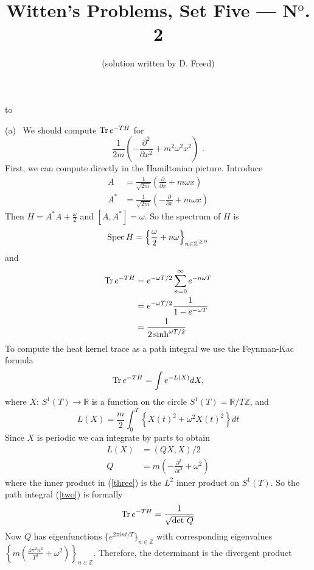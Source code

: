 \documentclass[12pt,leqno]{article}
\title{Witten's Problems, Set Five --- N$^{\text{o}}$. 2}
\author{(solution written by D. Freed)}
\date{}
\newcommand{\dbR}{{\mathbb{R}}}
\newcommand{\dbZ}{{\mathbb{Z}}}
\theoremstyle{plain}
{\theorembodyfont{}\newtheorem{thm}{Theorem}}
\theoremstyle{remark}
{\theorembodyfont{\rmfamily} \newtheorem*{Rem}{\bf Remark}}
\newcommand{\Ge}{{{\mathchoice{\,{\scriptstyle\ge}\,}
  {\,{\scriptstyle\ge}\,}
  {\,{\scriptscriptstyle\ge}\,}{\,{\scriptscriptstyle\ge}\,}}}}
\newcommand{\dspace}{\lineskip=2pt
     \baselineskip=18pt\lineskiplimit=0pt}
\newcommand{\Xdot}{\Dot{X}}
\newcommand{\Spec}{\text{\rm Spec}}
\newcommand{\Tr}{\text{\rm Tr}}
\begin{document}
\maketitle

\hbox to \hsize{\hrulefill}

\bigskip
\dspace
\noindent
(a) \ 
We should compute $\Tr\,e^{-TH}$ for
$$
\frac{1}{2m}\left(-\frac{\partial^2}{\partial x^2}+
m^2\omega^2 x^2\right)\,\,.
$$
First, we can compute directly in the Hamiltonian picture.
Introduce
\begin{align*}
A &=\frac{1}{\sqrt{2m}}\left(\frac{\partial}{\partial x}
  +m\omega x\right)\\
A^* &=\frac{1}{\sqrt{2m}}\left(-\frac{\partial}{\partial x}
+ m\omega x\right)
\end{align*}
Then $H=A^*A+\frac\omega2$ and $[A,A^*]=\omega$.
So the spectrum of $H$ is
$$
\Spec\,H=\left\{\frac\omega2+n\omega
\right\}_{n\in\dbZ^{^{\Ge 0}}}
$$
and
\begin{equation}
\begin{aligned}
\Tr\,e^{-TH} &=e^{-\omega T/2}\sum\limits_{n=0}^\infty
  e^{-n\omega T}\\
&= e^{-\omega T/2}\frac{1}{1-e^{-\omega T}}\\
&= \frac{1}{2\sinh^{\omega T/2}}
\label{one}
\end{aligned}
\end{equation}
To compute the heat kernel trace as a path integral we use
the Feynman-Kac formula
\begin{equation}
\Tr\,e^{-TH}=\int e^{-L(X)}dX,
\label{two}
\end{equation}
where $X\colon\, S^1(T)\to\dbR$ is a function on the circle
$S^1(T)=\dbR/T\dbZ$, and
$$
L(X)=\frac m2\int_0^T\left\{\Xdot(t)^2+
  \omega^2 X(t)^2\right\}dt
$$
Since $X$ is periodic we can integrate by parts to obtain
\begin{align}
L(X) &=(QX,X)/2\label{three}\\
Q &=m\left(-\frac{\partial^2}{\partial t^2}+\omega^2\right)
\label{four}
\end{align}
where the inner product in (\ref{three}) is the $L^2$
inner product on $S^1(T)$.
So the path integral (\ref{two}) is formally
\begin{equation}
\Tr\,e^{-TH}=\frac{1}{\sqrt{\det\,Q}}\label{five}
\end{equation}
Now $Q$ has eigenfunctions $\{e^{2\pi int/T}\}_{n\in\dbZ}$
with corresponding eigenvalues
$\left\{m\left(\frac{4\pi^2n^2}{T^2}
+\omega^2\right)\right\}_{n\in\dbZ}$.
Therefore, the determinant is the divergent product
\end{document}

